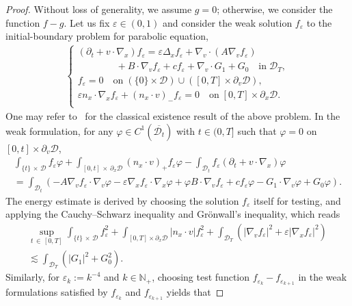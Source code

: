 \documentclass[10pt]{amsart}
\theoremstyle{definition}\newtheorem{defi}[theo]{Definition}\newtheorem{rema}[theo]{Remark}\newtheorem{exam}[theo]{Example}\newtheorem{exem}[theo]{Example}\newtheorem{nota}[theo]{Notation}
\newcommand*\p{\partial}
\newcommand*\N {\mathbb{N}}
\newcommand*\D {\mathcal{D}}
\begin{document}
\begin{proof}
Without loss of generality, we assume $g=0$; otherwise, we consider the function $f-g$. Let us fix $\varepsilon\in(0,1)$ and consider the weak solution $f_\varepsilon$ to the initial-boundary problem for parabolic equation,
\begin{align*}
\begin{cases}
(\partial_t+v\cdot\nabla_x)f_\varepsilon =\varepsilon\Delta_xf_\varepsilon + \nabla_v\cdot(A\nabla_v f_\varepsilon)\\
\qquad\qquad+ B\cdot\nabla_vf_\varepsilon +cf_\varepsilon + \nabla_v\cdot G_1 + G_0 \quad\text{in}\; \D_T, \\
f_\varepsilon= 0 \quad\text{on}\; (\{0\}\times\D)\cup([0,T]\times\p_v\D), \\
\varepsilon n_x\cdot\nabla_xf_\varepsilon + (n_x\cdot v)_-f_\varepsilon = 0 \quad\text{on}\; [0,T]\times\p_x\D. \\
\end{cases}
\end{align*}
One may refer to~\cite[III. \S~5]{Lady} for the classical existence result of the above problem. In the weak formulation, for any $\varphi\in C^1(\overline{\D_t})$ with $t\in(0,T]$ such that $\varphi=0$ on $[0,t]\times\p_v\D$,
\begin{multline}\label{FPeweak}
\int_{\{t\}\,\times\,\D}f_\varepsilon\varphi + \int_{[0,t]\,\times\,\p_x\D} (n_x\cdot v)_+f_\varepsilon\varphi -\int_{\D_t}f_\varepsilon\left(\p_t+v\cdot\nabla_x\right)\varphi \\
=\int_{\D_t} \left(-A\nabla_vf_\varepsilon\cdot\nabla_v\varphi-\varepsilon\nabla_xf_\varepsilon\cdot\nabla_x\varphi + \varphi B\cdot\nabla_vf_\varepsilon + c f_\varepsilon\varphi - G_1\cdot\nabla_v\varphi + G_0\varphi\right).
\end{multline}
The energy estimate is derived by choosing the solution $f_\varepsilon$ itself for testing, and applying the Cauchy--Schwarz inequality and Gr\"onwall's inequality, which reads
\begin{multline*}
\sup_{t\,\in\,[0,T]} \int_{\{t\}\,\times\,\D} f_\varepsilon^2 + \int_{[0,T]\times\p_x\D} \left|n_x\cdot v\right| f_\varepsilon^2 + \int_{\D_T} \left(\left|\nabla_vf_\varepsilon\right|^2 + \varepsilon
\left|\nabla_xf_\varepsilon\right|^2\right)\\
\lesssim \int_{\D_T} \left(|G_1|^2 +G_0^2\right).
\end{multline*}
Similarly, for $\varepsilon_k:=k^{-4}$ and $k\in\N_+$, choosing test function $f_{\varepsilon_{k}}-f_{\varepsilon_{k+1}}$ in the weak formulations satisfied by $f_{\varepsilon_{k}}$ and $f_{\varepsilon_{k+1}}$ yields that

\end{proof}
\end{document}
